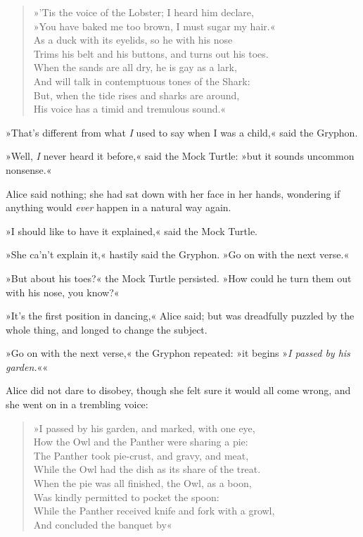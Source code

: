 \begin{verse}
»'Tis the voice of the Lobster; I heard him declare,\\
»You have baked me too brown, I must sugar my hair.«\\
As a duck with its eyelids, so he with his nose\\
Trims his belt and his buttons, and turns out his toes.\\
When the sands are all dry, he is gay as a lark,\\
And will talk in contemptuous tones of the Shark:\\
But, when the tide rises and sharks are around,\\
His voice has a timid and tremulous sound.«\\
\end{verse}

»That's different from what \textit{I} used to say when I was a child,« said the Gryphon.

»Well, \textit{I} never heard it before,« said the Mock Turtle: »but it sounds uncommon nonsense.«

Alice said nothing; she had sat down with her face in her hands, wondering if anything would \textit{ever} happen in a natural way again.

»I should like to have it explained,« said the Mock Turtle.

»She ca'n't explain it,« hastily said the Gryphon. »Go on with the next verse.«

»But about his toes?« the Mock Turtle persisted. »How could he turn them out with his nose, you know?«

»It's the first position in dancing,« Alice said; but was dreadfully puzzled by the whole thing, and longed to change the subject.

»Go on with the next verse,« the Gryphon repeated: »it begins »\textit{I passed by his garden.}««

Alice did not dare to disobey, though she felt sure it would all come wrong, and she went on in a trembling voice:

\begin{verse}
»I passed by his garden, and marked, with one eye,\\
How the Owl and the Panther were sharing a pie:\\
The Panther took pie-crust, and gravy, and meat,\\
While the Owl had the dish as its share of the treat.\\
When the pie was all finished, the Owl, as a boon,\\
Was kindly permitted to pocket the spoon:\\
While the Panther received knife and fork with a growl,\\
And concluded the banquet by\longdash«\\
\end{verse}


